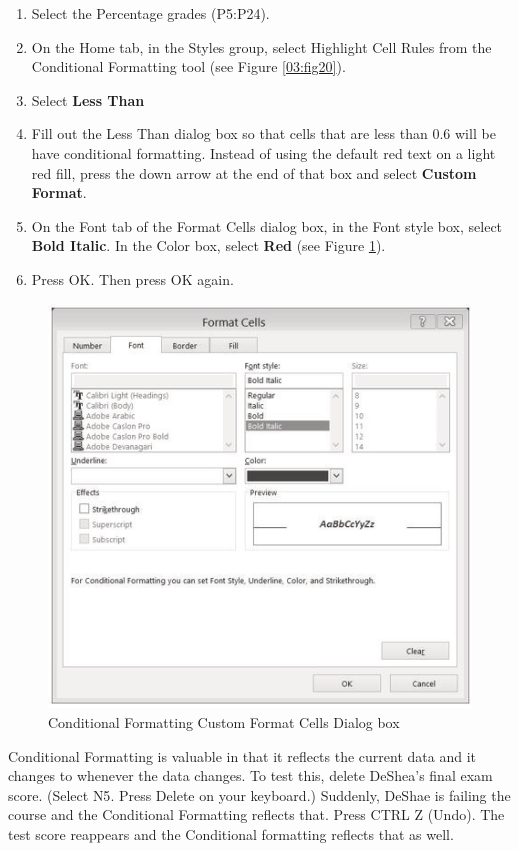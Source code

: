 \begin{enumerate}
	\item Select the Percentage grades (\textsf{P5:P24}).
	\item On the Home tab, in the Styles group, select Highlight Cell Rules from the Conditional Formatting tool (see Figure \ref{03:fig20}).
	\item Select \textbf{Less Than}
	\item Fill out the Less Than dialog box so that cells that are less than $ 0.6 $ will be have conditional formatting. Instead of using the default red text on a light red fill, press the down arrow at the end of that box and select \textbf{Custom Format}.
	\item On the Font tab of the Format Cells dialog box, in the Font style box, select \textbf{Bold Italic}. In the Color box, select \textbf{Red} (see Figure \ref{03:fig22}).
	\item Press OK. Then press OK again.
\end{enumerate}

\begin{figure}[H]
	\centering
	\includegraphics[width=\maxwidth{.95\linewidth}]{gfx/ch03_fig22}
	\caption{Conditional Formatting Custom Format Cells Dialog box}
	\label{03:fig22}
\end{figure}

Conditional Formatting is valuable in that it reflects the current data and it changes to whenever the data changes. To test this, delete DeShea's final exam score. (Select \textsf{N5}. Press Delete on your keyboard.) Suddenly, DeShae is failing the course and the Conditional Formatting reflects that. Press CTRL Z (Undo). The test score reappears and the Conditional formatting reflects that as well.

